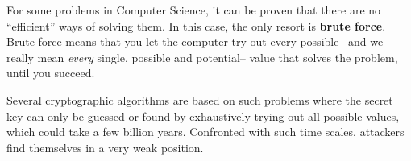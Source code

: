 
For some problems in Computer Science, it can be proven that there are
no ``efficient'' ways of solving them. In this case, the only resort is
\textbf{brute force}. Brute force means that you let the computer try out
every possible --and we really mean \emph{every} single, possible and
potential-- value that solves the problem, until you succeed.

Several cryptographic algorithms are based on such problems where the
secret key can only be guessed or found by
exhaustively trying out all possible values, which could take a few
billion years. Confronted with
such time scales, attackers find themselves in a very weak position.
